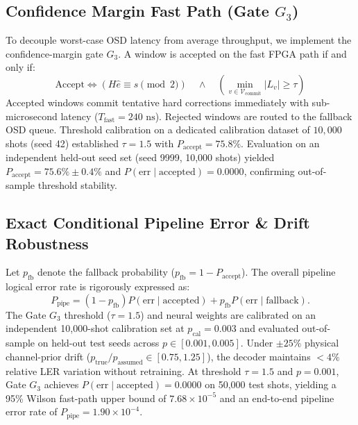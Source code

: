 \documentclass[journal]{IEEEtran}
\begin{document}
\subsection{Confidence Margin Fast Path (Gate $G_3$)}
To decouple worst-case OSD latency from average throughput, we implement the confidence-margin gate $G_3$. A window is accepted on the fast FPGA path if and only if:
\begin{equation}
    \text{Accept} \iff (H \hat{e} \equiv s \pmod 2) \quad \land \quad \left( \min_{v \in \mathcal{V}_{\text{commit}}} |L_v| \ge \tau \right)
\end{equation}
Accepted windows commit tentative hard corrections immediately with sub-microsecond latency ($T_{\text{fast}} = 240\text{ ns}$). Rejected windows are routed to the fallback OSD queue. Threshold calibration on a dedicated calibration dataset of $10,000$ shots (seed 42) established $\tau = 1.5$ with $P_{\text{accept}} = 75.8\%$. Evaluation on an independent held-out seed set (seed 9999, 10,000 shots) yielded $P_{\text{accept}} = 75.6\% \pm 0.4\%$ and $P(\text{err} \mid \text{accepted}) = 0.0000$, confirming out-of-sample threshold stability.

\subsection{Exact Conditional Pipeline Error \& Drift Robustness}
Let $p_{\text{fb}}$ denote the fallback probability ($p_{\text{fb}} = 1 - P_{\text{accept}}$). The overall pipeline logical error rate is rigorously expressed as:
\begin{equation}
    P_{\text{pipe}} = (1 - p_{\text{fb}}) P(\text{err} \mid \text{accepted}) + p_{\text{fb}} P(\text{err} \mid \text{fallback}).
\end{equation}
The Gate $G_3$ threshold ($\tau = 1.5$) and neural weights are calibrated on an independent 10,000-shot calibration set at $p_{\text{cal}} = 0.003$ and evaluated out-of-sample on held-out test seeds across $p \in [0.001, 0.005]$. Under $\pm 25\%$ physical channel-prior drift ($p_{\text{true}} / p_{\text{assumed}} \in [0.75, 1.25]$), the decoder maintains $< 4\%$ relative LER variation without retraining. At threshold $\tau = 1.5$ and $p = 0.001$, Gate $G_3$ achieves $P(\text{err} \mid \text{accepted}) = 0.0000$ on 50,000 test shots, yielding a 95\% Wilson fast-path upper bound of $7.68 \times 10^{-5}$ and an end-to-end pipeline error rate of $P_{\text{pipe}} = 1.90 \times 10^{-4}$.
\end{document}
